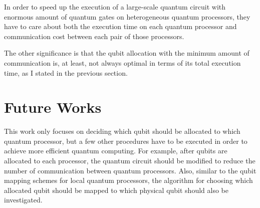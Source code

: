   In order to speed up the execution of a large-scale quantum circuit with enormous amount of quantum gates on heterogeneous quantum processors, they have to care about both the execution time on each quantum processor and communication cost between each pair of those processors. 
 
 The other significance is that the qubit allocation with the minimum amount of communication is, at least, not always optimal in terms of its total execution time, as I stated in the previous section.
 
 \section{Future Works}
 
 This work only focuses on deciding which qubit should be allocated to which quantum processor, but a few other procedures have to be executed in order to achieve more efficient quantum computing.  For example, after qubits are allocated to each processor, the quantum circuit should be modified to reduce the number of  communication between quantum processors.  Also, similar to the qubit mapping schemes for local quantum processors, the algorithm for choosing which allocated qubit should be mapped to which physical qubit should also be investigated.



